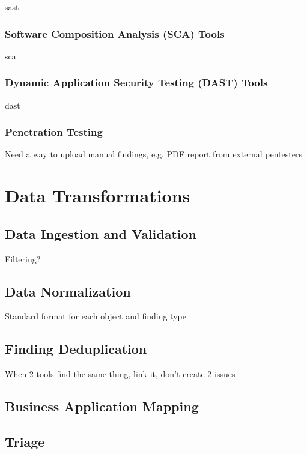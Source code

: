 \gls{sast}

\subsubsection{Software Composition Analysis (SCA) Tools}

\gls{sca}

\subsubsection{Dynamic Application Security Testing (DAST) Tools}

\gls{dast}

\subsubsection{Penetration Testing}

Need a way to upload manual findings, e.g. PDF report from external pentesters



\section{Data Transformations}

\subsection{Data Ingestion and Validation}

Filtering?

\subsection{Data Normalization}

Standard format for each object and finding type

\subsection{Finding Deduplication}

When 2 tools find the same thing, link it, don't create 2 issues

\subsection{Business Application Mapping}

\subsection{Triage}



